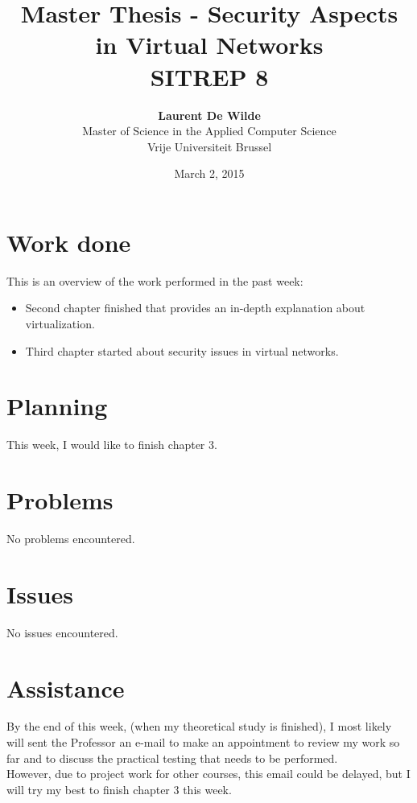 \documentclass[11pt, a4paper]{article}
\title{Master Thesis -  Security Aspects in Virtual Networks\\ \textbf{SITREP 8}}
\author{\textbf{Laurent De Wilde} \\ Master of Science in the Applied Computer Science \\ Vrije Universiteit Brussel}
\date{March 2, 2015}
\begin{document}
\maketitle

\section*{Work done}

This is an overview of the work performed in the past week:
\begin{itemize}
\item Second chapter finished that provides an in-depth explanation about virtualization.
\item Third chapter started about security issues in virtual networks.
\end{itemize}

\section*{Planning}
 
This week, I would like to finish chapter 3.

\section*{Problems}

No problems encountered.

\section*{Issues}

No issues encountered.

\section*{Assistance}

By the end of this week, (when my theoretical study is finished), I most likely will sent the Professor an e-mail to make an appointment to review my work so far and to discuss the practical testing that needs to be performed. \\
However, due to project work for other courses, this email could be delayed, but I will try my best to finish chapter 3 this week.
\end{document}
